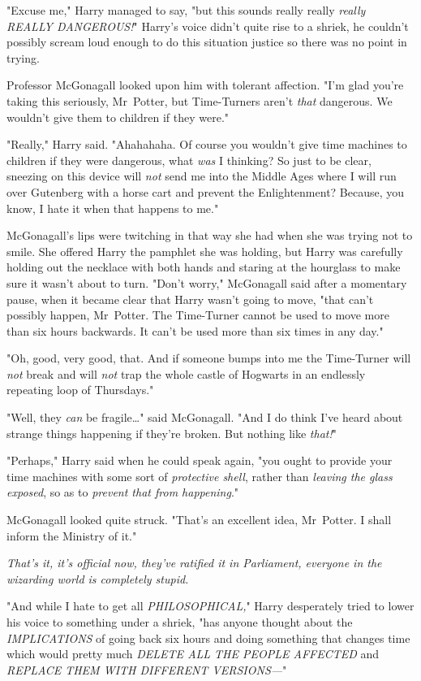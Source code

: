 "Excuse me," Harry managed to say, "but this sounds really really \emph{really
REALLY DANGEROUS!}" Harry's voice didn't quite rise to a shriek, he couldn't
possibly scream loud enough to do this situation justice so there was no point
in trying.

Professor McGonagall looked upon him with tolerant affection. "I'm glad you're
taking this seriously, Mr~Potter, but Time-Turners aren't \emph{that}
dangerous. We wouldn't give them to children if they were."

"Really," Harry said. "Ahahahaha. Of course you wouldn't give time machines to
children if they were dangerous, what \emph{was} I thinking? So just to be
clear, sneezing on this device will \emph{not} send me into the Middle Ages
where I will run over Gutenberg with a horse cart and prevent the
Enlightenment? Because, you know, I hate it when that happens to me."

McGonagall's lips were twitching in that way she had when she was trying not to
smile. She offered Harry the pamphlet she was holding, but Harry was carefully
holding out the necklace with both hands and staring at the hourglass to make
sure it wasn't about to turn. "Don't worry," McGonagall said after a momentary
pause, when it became clear that Harry wasn't going to move, "that can't
possibly happen, Mr~Potter. The Time-Turner cannot be used to move more than
six hours backwards. It can't be used more than six times in any day."

"Oh, good, very good, that. And if someone bumps into me the Time-Turner will
\emph{not} break and will \emph{not} trap the whole castle of Hogwarts in an
endlessly repeating loop of Thursdays."

"Well, they \emph{can} be fragile…" said McGonagall. "And I do think
I've heard about strange things happening if they're broken. But nothing like
\emph{that!}"

"Perhaps," Harry said when he could speak again, "you ought to provide your
time machines with some sort of \emph{protective shell}, rather than
\emph{leaving the glass exposed}, so as to \emph{prevent that from happening}."

McGonagall looked quite struck. "That's an excellent idea, Mr~Potter. I shall
inform the Ministry of it."

\emph{That's it, it's official now, they've ratified it in Parliament, everyone
in the wizarding world is completely stupid.}

"And while I hate to get all \emph{PHILOSOPHICAL,}" Harry desperately tried to
lower his voice to something under a shriek, "has anyone thought about the
\emph{IMPLICATIONS} of going back six hours and doing something that changes
time which would pretty much \emph{DELETE ALL THE PEOPLE AFFECTED} and
\emph{REPLACE THEM WITH DIFFERENT VERSIONS---}"

